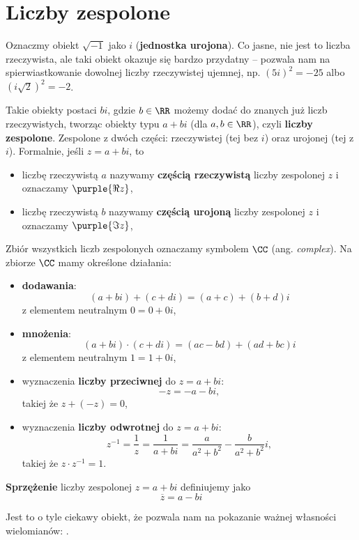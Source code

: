 \section{Liczby zespolone}

Oznaczmy obiekt $\sqrt{-1}$ jako $i$ (\textbf{jednostka urojona}). Co jasne, nie jest to liczba rzeczywista, ale taki obiekt okazuje się bardzo przydatny -- pozwala nam na spierwiastkowanie dowolnej liczby rzeczywistej ujemnej, np. $(5i)^2 = -25$ albo $(i\sqrt{2})^2 = -2$.

Takie obiekty postaci $bi$, gdzie $b \in \RR$ możemy dodać do znanych już liczb rzeczywistych, tworząc obiekty typu $a + bi$ (dla $a, b \in \RR$), czyli \textbf{liczby zespolone}. Zespolone z dwóch części: rzeczywistej (tej bez $i$) oraz urojonej (tej z $i$). Formalnie, jeśli $z=a+bi$, to
\begin{itemize}
    \item liczbę rzeczywistą $a$ nazywamy \textbf{częścią rzeczywistą} liczby zespolonej $z$ i oznaczamy $\purple{\Re z}$,
    \item liczbę rzeczywistą $b$ nazywamy \textbf{częścią urojoną} liczby zespolonej $z$ i oznaczamy $\purple{\Im z}$,
\end{itemize}

Zbiór wszystkich liczb zespolonych oznaczamy symbolem $\CC$ (ang. \textit{complex}). Na zbiorze $\CC$ mamy określone działania:
\begin{itemize}
    \item \textbf{dodawania}:
    $$
    (a+bi)+(c+di)=(a+c)+(b+d)i
    $$
    z elementem neutralnym $0=0+0i$,
    \item \textbf{mnożenia}:
    $$
    (a+bi)\cdot(c+di)=(ac-bd)+(ad+bc)i
    $$
    z elementem neutralnym $1=1+0i$,
    \item wyznaczenia \textbf{liczby przeciwnej} do $z=a+bi$:
    $$
    -z=-a-bi,
    $$
    takiej że $z+(-z)=0$,
    \item wyznaczenia \textbf{liczby odwrotnej} do $z=a+bi$:
    $$
    z^{-1}=\frac{1}{z}=\frac{1}{a+bi}=\frac{a}{a^2+b^2}-\frac{b}{a^2+b^2}i,
    $$
    takiej że $z\cdot z^{-1}=1$.
\end{itemize}

\textbf{Sprzężenie} liczby zespolonej $z = a + bi$ definiujemy jako
$$\overline{z}=a-bi$$

Jest to o tyle ciekawy obiekt, że pozwala nam na pokazanie ważnej własności wielomianów: . \; \textbf{}

